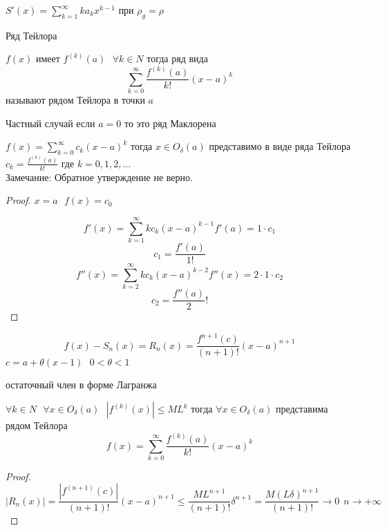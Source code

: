 \begin{block}[Следствие 3]
  $S'(x) = \sum_{k=1}^{\infty}k a_k x^{k-1}$ при $\rho_g = \rho$
\end{block}

\begin{title}
  Ряд Тейлора
\end{title}

\begin{define}
  $f(x)$ имеет $f^{(k)}(a) ~~~ \forall k \in N$ тогда ряд вида
  $$
  \sum_{k=0}^{\infty} \frac{f^{(k)}(a)}{k!} (x-a)^k
  $$
  называют рядом Тейлора в точки $a$

  Частный случай если $a = 0$ то это ряд Маклорена
\end{define}

\begin{theorem}
  $f(x) = \sum_{k=0}^{\infty} c_k(x-a)^k$ тогда $x \in O_{\delta}(a)$
  представимо в виде ряда Тейлора
  $c_k = \frac{f^{(k)}(a)}{k!}$ где $k = 0,1,2, \ldots$ \\

  Замечание: Обратное утверждение не верно.
\end{theorem}

\begin{proof}
  $x = a ~~~ f(x) = c_0$

  $$
  f'(x) = \sum_{k=1}^{\infty} k c_k(x - a)^{k - 1} f'(a) = 1 \cdot c_1
  $$
  $$
  c_1 = \frac{f'(a)}{1!}
  $$
  $$
  f''(x) = \sum_{k=2}^{\infty} k c_k (x - a)^{k-2} f''(x) = 2 \cdot 1 \cdot c_2
  $$
  $$
  c_2 = \frac{f''(a)} 2!
  $$
\end{proof}

\begin{define}
  $$
  f(x) - S_n(x) = R_n(x) = \frac{f^{n+1}(c)}{(n+1)!} (x - a)^{n+1}
  $$
  $c = a + \theta(x-1) ~~~ 0 < \theta < 1$

  остаточный член в форме Лагранжа
\end{define}

\begin{theorem}
  $\forall k \in N ~~~ \forall x \in O_{\delta}(a) ~~~ |f^{(k)}(x)| \le M L^k$
  тогда $\forall x \in O_{\delta}(a)$ представима рядом Тейлора
  $$
  f(x) = \sum_{k=0}^{\infty} \frac{f^{(k)}(a)}{k!} (x-a)^k
  $$
\end{theorem}

\begin{proof}
  $$
  |R_n(x)| = \frac{| f^{(n+1)}(c) |}{(n+1)!} (x-a)^{n+1} \le
  \frac{ML^{n+1}}{(n+1)!} \delta^{n+1} =
  \frac{ M (L\delta)^{n+1} }{(n+1)!} \to 0 ~~ n \to +\infty
  $$
\end{proof}